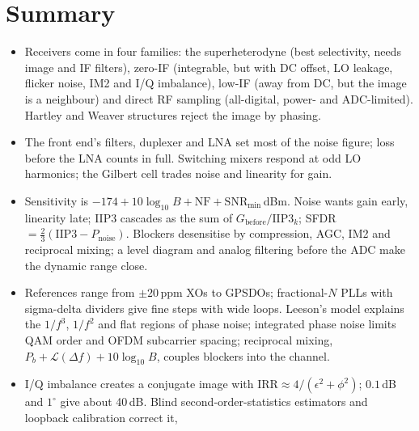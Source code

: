 
\section*{Summary}

\begin{itemize}
\item Receivers come in four families: the superheterodyne (best selectivity, needs image and IF filters),
zero-IF (integrable, but with DC offset, LO leakage, flicker noise, IM2 and I/Q imbalance), low-IF (away
from DC, but the image is a neighbour) and direct RF sampling (all-digital, power- and ADC-limited).
Hartley and Weaver structures reject the image by phasing.
\item The front end's filters, duplexer and LNA set most of the noise figure; loss before the LNA counts
in full. Switching mixers respond at odd LO harmonics; the Gilbert cell trades noise and linearity for gain.
\item Sensitivity is $-174+10\log_{10}B+\text{NF}+\text{SNR}_{\min}$\,dBm. Noise wants gain early, linearity
late; IIP3 cascades as the sum of $G_{\text{before}}/\text{IIP3}_k$; SFDR $=\tfrac23(\text{IIP3}-P_{\text{noise}})$.
Blockers desensitise by compression, AGC, IM2 and reciprocal mixing; a level diagram and analog filtering
before the ADC make the dynamic range close.
\item References range from $\pm20$\,ppm XOs to GPSDOs; fractional-$N$ PLLs with sigma-delta dividers give
fine steps with wide loops. Leeson's model explains the $1/f^3$, $1/f^2$ and flat regions of phase noise;
integrated phase noise limits QAM order and OFDM subcarrier spacing; reciprocal mixing,
$P_b+\mathcal L(\Delta f)+10\log_{10}B$, couples blockers into the channel.
\item I/Q imbalance creates a conjugate image with $\text{IRR}\approx4/(\epsilon^2+\phi^2)$; $0.1$\,dB and
$1^\circ$ give about 40\,dB. Blind second-order-statistics estimators and loopback calibration correct it,

\end{itemize}

